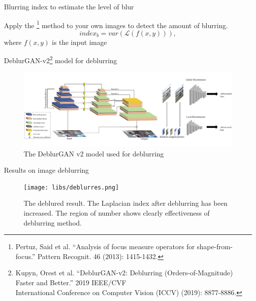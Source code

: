 \documentclass{libs/ufc_format}
\begin{document}
\begin{frame}{\small Blurring index to estimate the level of blur}

   
    Apply the \footnote[frame]{\tiny Pertuz, Said et al. “Analysis of focus measure operators for shape-from-focus.” Pattern Recognit. 46 (2013): 1415-1432.}\cite{Pertuz2013AnalysisOF} method to your own images to detect the amount of blurring.
    \begin{equation}
        index_b = var(\mathcal{L}(f(x,y))),
    \end{equation}
    where $f(x,y)$ is the input image 
\end{frame}
\begin{frame}{\small DeblurGAN-v2\footnote[frame]{\tiny Kupyn, Orest et al. “DeblurGAN-v2: Deblurring (Orders-of-Magnitude) Faster and Better.” 2019 IEEE/CVF \\International Conference on Computer Vision (ICCV) (2019): 8877-8886.} model for deblurring }
    \begin{figure}
        \centering
        \includegraphics[width=1\textwidth]{libs/pipeline.jpg}
        \caption{The DeblurGAN v2 model used for deblurring \cite{Kupyn2019DeblurGANv2D}}
    \end{figure}

\end{frame}
\begin{frame}{\small Results on image deblurring}
    \begin{figure}
        \texttt{[image: libs/deblurres.png]}
        \caption{The deblured result. The Laplacian index after deblurring has been increased. The region of number shows clearly effectiveness of deblurring method.}
    \end{figure}
\end{frame}
\end{document}
